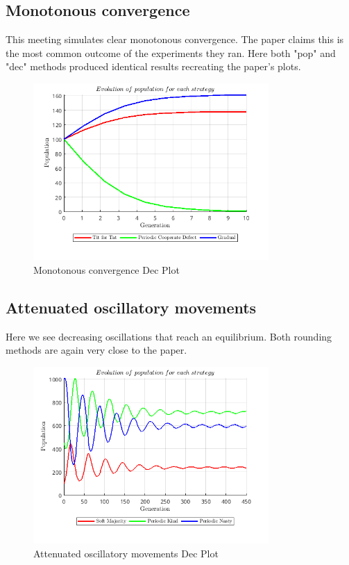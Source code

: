 \subsection{Monotonous convergence}
This meeting simulates clear monotonous convergence. The paper claims this is the most common outcome of the experiments they ran. Here both "pop" and "dec" methods produced identical results recreating the paper's plots. 
\begin{figure}[H]
    \centering
    \includegraphics[width=0.8\textwidth]{media/meetings/monotonous_convergence_dec.png}
    \caption{Monotonous convergence Dec Plot}
\end{figure}

\subsection{Attenuated oscillatory movements}
Here we see decreasing oscillations that reach an equilibrium. Both rounding methods are again very close to the paper.
\begin{figure}[H]
    \centering
    \includegraphics[width=0.8\textwidth]{media/meetings/attenuated_oscillatory_movements_dec.png}
    \caption{Attenuated oscillatory movements Dec Plot}
\end{figure}

